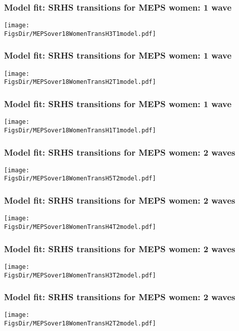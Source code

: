 \documentclass[aspectratio=169]{beamer}
\newcommand{\FigsDir}{../Figures}
\begin{document}
\begin{frame}\frametitle{Model fit: SRHS transitions for MEPS women: 1 wave}
\begin{center}
	\texttt{[image: \\FigsDir/MEPSover18WomenTransH3T1model.pdf]}
\end{center}
\end{frame}

\begin{frame}\frametitle{Model fit: SRHS transitions for MEPS women: 1 wave}
\begin{center}
	\texttt{[image: \\FigsDir/MEPSover18WomenTransH2T1model.pdf]}
\end{center}
\end{frame}

\begin{frame}\frametitle{Model fit: SRHS transitions for MEPS women: 1 wave}
\begin{center}
	\texttt{[image: \\FigsDir/MEPSover18WomenTransH1T1model.pdf]}
\end{center}
\end{frame}

\begin{frame}\frametitle{Model fit: SRHS transitions for MEPS women: 2 waves}
\begin{center}
	\texttt{[image: \\FigsDir/MEPSover18WomenTransH5T2model.pdf]}
\end{center}
\end{frame}

\begin{frame}\frametitle{Model fit: SRHS transitions for MEPS women: 2 waves}
\begin{center}
\texttt{[image: \\FigsDir/MEPSover18WomenTransH4T2model.pdf]}
\end{center}
\end{frame}

\begin{frame}\frametitle{Model fit: SRHS transitions for MEPS women: 2 waves}
\begin{center}
\texttt{[image: \\FigsDir/MEPSover18WomenTransH3T2model.pdf]}
\end{center}
\end{frame}

\begin{frame}\frametitle{Model fit: SRHS transitions for MEPS women: 2 waves}
\begin{center}
\texttt{[image: \\FigsDir/MEPSover18WomenTransH2T2model.pdf]}
\end{center}
\end{frame}
\end{document}
